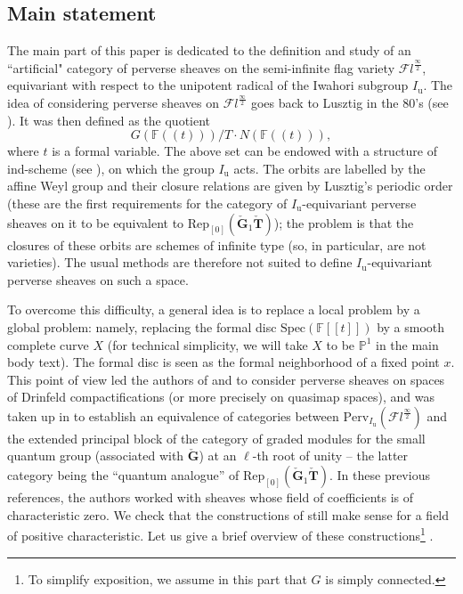 \documentclass[11pt]{amsart}
\theoremstyle{plain}
\theoremstyle{remark}
\numberwithin{equation}{section}
\begin{document}
 \subsection{Main statement} The main part of this paper is dedicated to the definition and study of an ``artificial" category of perverse sheaves on the semi-infinite flag variety $\mathcal{F}l^{\frac{\infty}{2}}$, equivariant with respect to the unipotent radical of the Iwahori subgroup $I_\mathrm{u}$. The idea of considering perverse sheaves on $\mathcal{F}l^{\frac{\infty}{2}}$ goes back to Lusztig in the 80's (see \cite[§11]{lusztigintersection}). It was then defined as the quotient 
 $$G(\mathbb{F}((t)))/T\cdot N(\mathbb{F}((t))),$$
 where $t$ is a formal variable. The above set can be endowed with a structure of ind-scheme (see \cite[§4]{finkelberg1997semiinfinite}), on which the group $I_\mathrm{u}$ acts. The orbits are labelled by the affine Weyl group and their closure relations are given by Lusztig's periodic order (these are the first requirements for the category of $I_\mathrm{u}$-equivariant perverse sheaves on it to be equivalent to $\mathrm{Rep}_{[0]}(\check{\mathbf{G}}_1\check{\mathbf{T}})$); the problem is that the closures of these orbits are schemes of infinite type (so, in particular, are not varieties). The usual methods are therefore not suited to define $I_\mathrm{u}$-equivariant perverse sheaves on such a space. 
 
 To overcome this difficulty, a general idea is to replace a local problem by a global problem: namely, replacing the formal disc $\mathrm{Spec}(\mathbb{F}[[t]])$ by a smooth complete curve $X$ (for technical simplicity, we will take $X$ to be $\mathbb{P}^1$ in the main body text). The formal disc is seen as the formal neighborhood of a fixed point $x$. This point of view led the authors of \cite{finkelberg1997semiinfinite} and \cite{feigin2semi} to consider perverse sheaves on spaces of Drinfeld compactifications (or more precisely on quasimap spaces), and was taken up in \cite{ABBGM} to establish an equivalence of categories between $\mathrm{Perv}_{I_\mathrm{u}}(\mathcal{F}l^{\frac{\infty}{2}})$ and the extended principal block of the category of graded modules for the small quantum group (associated with $\check{\mathbf{G}}$) at an $\ell$-th root of unity -- the latter category being the ``quantum analogue'' of $\mathrm{Rep}_{[0]}(\check{\mathbf{G}}_1\check{\mathbf{T}})$. In these previous references, the authors worked with sheaves whose field of coefficients is of characteristic zero. We check that the constructions of \cite{ABBGM} still make sense for a field of positive characteristic. Let us give a brief overview of these constructions\footnote{To simplify exposition, we assume in this part that $G$ is simply connected.} .
 
\end{document}
